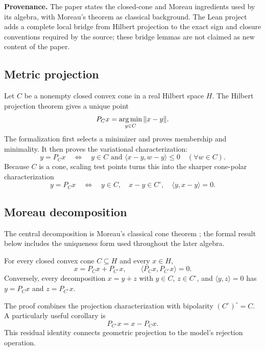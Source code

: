\documentclass[11pt,a4paper]{article}
\begin{document}
\textbf{Provenance.} The paper states the closed-cone and Moreau ingredients
used by its algebra, with Moreau's theorem as classical background. The Lean
project adds a complete local bridge from Hilbert projection to the exact sign
and closure conventions required by the source; these bridge lemmas are not
claimed as new content of the paper.

\subsection{Metric projection}

Let \(C\) be a nonempty closed convex cone in a real Hilbert space \(H\).
The Hilbert projection theorem gives a unique point
\[
  P_Cx=\operatorname*{arg\,min}_{y\in C}\|x-y\|.
\]
The formalization first selects a minimizer and proves membership and
minimality. It then proves the variational characterization:
\[
  y=P_Cx
  \quad\Longleftrightarrow\quad
  y\in C
  \text{ and }
  \langle x-y,w-y\rangle\leq0
  \quad(\forall w\in C).
\]
Because \(C\) is a cone, scaling test points turns this into the sharper
cone-polar characterization
\[
  y=P_Cx
  \quad\Longleftrightarrow\quad
  y\in C,\quad x-y\in C^\circ,\quad
  \langle y,x-y\rangle=0.
\]

\subsection{Moreau decomposition}

The central decomposition is Moreau's classical cone theorem
\cite{moreau1962}; the formal result below includes the uniqueness form used
throughout the later algebra.

\begin{theorem}
\label{thm:moreau}
For every closed convex cone \(C\subseteq H\) and every \(x\in H\),
\[
  x=P_Cx+P_{C^\circ}x,
  \qquad
  \langle P_Cx,P_{C^\circ}x\rangle=0.
\]
Conversely, every decomposition \(x=y+z\) with
\(y\in C\), \(z\in C^\circ\), and \(\langle y,z\rangle=0\) has
\(y=P_Cx\) and \(z=P_{C^\circ}x\).
\end{theorem}

The proof combines the projection characterization with bipolarity
\((C^\circ)^\circ=C\). A particularly useful corollary is
\[
  P_{C^\circ}x=x-P_Cx.
\]
This residual identity connects geometric projection to the model's
rejection operation.
\end{document}
